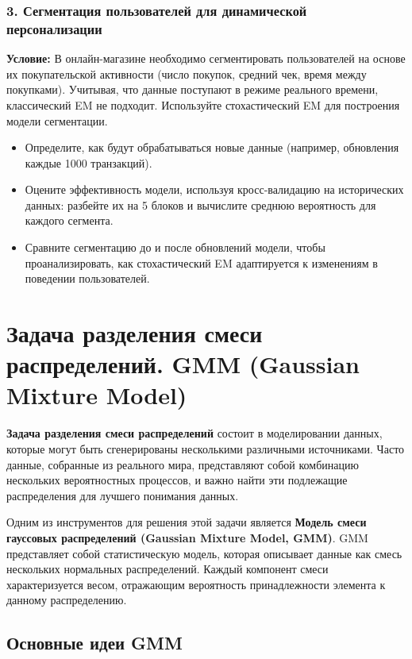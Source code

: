 \subsubsection*{3. Сегментация пользователей для динамической персонализации}
\textbf{Условие:} В онлайн-магазине необходимо сегментировать пользователей на основе их покупательской активности (число покупок, средний чек, время между покупками). Учитывая, что данные поступают в режиме реального времени, классический EM не подходит. Используйте стохастический EM для построения модели сегментации.
\begin{itemize}
\item Определите, как будут обрабатываться новые данные (например, обновления каждые 1000 транзакций).
\item Оцените эффективность модели, используя кросс-валидацию на исторических данных: разбейте их на 5 блоков и вычислите среднюю вероятность для каждого сегмента.
\item Сравните сегментацию до и после обновлений модели, чтобы проанализировать, как стохастический EM адаптируется к изменениям в поведении пользователей.
\end{itemize}


\section{Задача разделения смеси распределений. GMM (Gaussian Mixture Model)}

\textbf{Задача разделения смеси распределений} состоит в моделировании данных, которые могут быть сгенерированы несколькими различными источниками. Часто данные, собранные из реального мира, представляют собой комбинацию нескольких вероятностных процессов, и важно найти эти подлежащие распределения для лучшего понимания данных.

Одним из инструментов для решения этой задачи является \textbf{Модель смеси гауссовых распределений (Gaussian Mixture Model, GMM)}. GMM представляет собой статистическую модель, которая описывает данные как смесь нескольких нормальных распределений. Каждый компонент смеси характеризуется весом, отражающим вероятность принадлежности элемента к данному распределению.

\subsection{Основные идеи  GMM}

